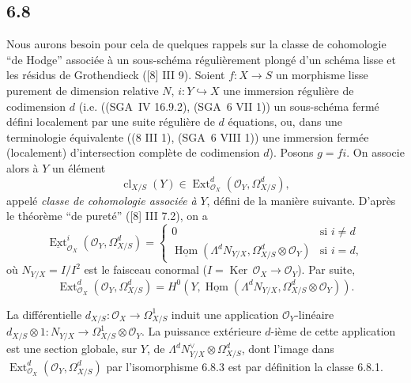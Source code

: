 \documentclass[11pt]{article}
\providecommand{\cO}{\mathcal{O}}
\DeclareMathOperator{\Hom}{Hom}
\DeclareMathOperator{\Ext}{Ext}
\providecommand{\Ker}{\operatorname{Ker}}
\providecommand{\cl}{\operatorname{cl}}
\providecommand{\OO}{\mathcal{O}}
\providecommand{\Hom}{\operatorname{Hom}}
\providecommand{\Ker}{\operatorname{Ker}}
\providecommand{\Ker}{\operatorname{Ker}}
\providecommand{\cl}{\operatorname{cl}}
\providecommand{\Hom}{\operatorname{Hom}}
\providecommand{\cl}{\operatorname{cl}}
\begin{document}
\subsection*{6.8}
Nous aurons besoin pour cela de quelques rappels sur la classe de cohomologie ``de Hodge'' associée à un sous-schéma régulièrement plongé d'un schéma lisse et les résidus de Grothendieck ([8] III 9). Soient $f:X\to S$ un morphisme lisse purement de dimension relative $N$, $i:Y\hookrightarrow X$ une immersion régulière de codimension $d$ (i.e. ((SGA~IV 16.9.2), (SGA~6 VII 1)) un sous-schéma fermé défini localement par une suite régulière de $d$ équations, ou, dans une terminologie équivalente ((8 III 1), (SGA~6 VIII 1)) une immersion fermée (localement) d'intersection complète de codimension $d$). Posons $g=fi$. On associe alors à $Y$ un élément
\begin{equation}
\tag{6.8.1}
\cl_{X/S}(Y)\in\Ext^d_{\cO_X}(\cO_Y,\Omega^d_{X/S}),
\end{equation}
appelé \emph{classe de cohomologie associée à} $Y$, défini de la manière suivante. D'après le théorème ``de pureté'' ([8] III 7.2), on a
\begin{equation}
\tag{6.8.2}
\underline{\Ext}^i_{\cO_X}(\cO_Y,\Omega^d_{X/S})=
\begin{cases}
0& \text{si } i\ne d\\
\underline{\Hom}(\Lambda^d N_{Y/X},\Omega^d_{X/S}\otimes\cO_Y)& \text{si } i=d,
\end{cases}
\end{equation}
où $N_{Y/X}=I/I^2$ est le faisceau conormal ($I=\Ker\,\cO_X\to\cO_Y$). Par suite,
\begin{equation}
\tag{6.8.3}
\Ext^d_{\cO_X}(\cO_Y,\Omega^d_{X/S})=H^0(Y,\underline{\Hom}(\Lambda^dN_{Y/X},\Omega^d_{X/S}\otimes\cO_Y)).
\end{equation}

La différentielle $d_{X/S}:\OO_X\to\Omega^1_{X/S}$ induit une application $\OO_Y$-linéaire $d_{X/S}\otimes 1:N_{Y/X}\longrightarrow \Omega^1_{X/S}\otimes\OO_Y$. La puissance extérieure $d$-ième de cette application est une section globale, sur $Y$, de $\Lambda^d N_{Y/X}^{\vee}\otimes\Omega^d_{X/S}$, dont l'image dans $\Ext^d_{\OO_X}(\OO_Y,\Omega^d_{X/S})$ par l'isomorphisme 6.8.3 est par définition la classe 6.8.1.
\end{document}
